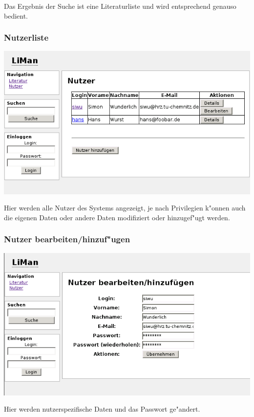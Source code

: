 Das Ergebnis der Suche ist eine Literaturliste und wird entsprechend genauso bedient.

\subsubsection{Nutzerliste}
\includegraphics[scale=0.6]{user.png}

Hier werden alle Nutzer des Systems angezeigt, je nach Privilegien k"onnen auch die eigenen Daten oder andere
Daten modifiziert oder hinzugef"ugt werden.

\subsubsection{Nutzer bearbeiten/hinzuf"ugen}
\includegraphics[scale=0.6]{usermod.png}

Hier werden nutzerspezifische Daten und das Passwort ge"andert.
